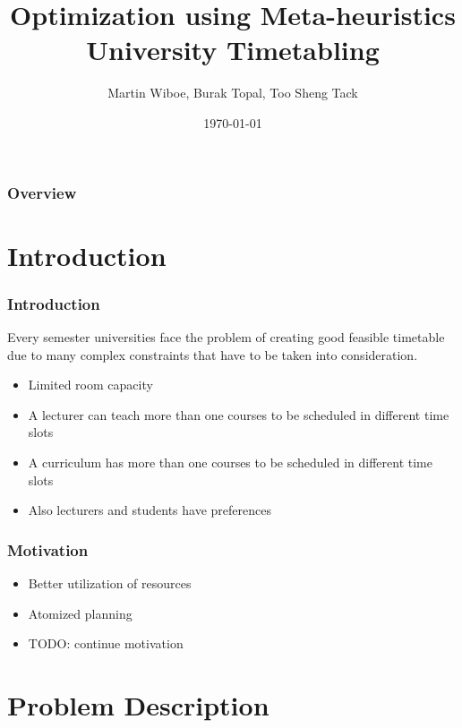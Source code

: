 \documentclass{beamer}
\title{Optimization using Meta-heuristics
University Timetabling} %
\author{Martin Wiboe,  Burak Topal, Too Sheng Tack  } %
\institute[DTU] %
{

DTU 2015
 \\ %
\medskip

}
\date{\today} %
\begin{document}
\begin{frame}
\titlepage %
\end{frame}

\begin{frame}
\frametitle{Overview} %
\tableofcontents 
\end{frame}


\section{Introduction} 


\begin{frame}
\frametitle{Introduction}

Every semester universities face the problem of creating good feasible timetable due to many complex constraints that have to be taken into consideration.
\begin{itemize}
\item Limited room capacity
\item A lecturer can teach more than one courses to be scheduled in different time slots
\item A curriculum has more than one courses to be scheduled in different time slots
\item Also lecturers and students have preferences
\end{itemize}

\end{frame}


\begin{frame}
\frametitle{Motivation}
\begin{itemize}
\item Better utilization of resources
\item Atomized planning 
\item TODO: continue motivation 
\end{itemize}
\end{frame}

\section{Problem Description} %
\end{document}
